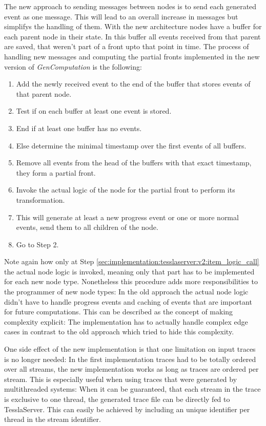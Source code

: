 The new approach to sending messages between nodes is to send each generated event as one message.
This will lead to an overall increase in messages but simplifys the handling of them.
With the new architecture nodes have a buffer for each parent node in their state.
In this buffer all events received from that parent are saved, that weren't part of a front upto that point in time.
The process of handling new messages and computing the partial fronts implemented in the new version of \emph{GenComputation} is the following:

\begin{enumerate}
  \item Add the newly received event to the end of the buffer that stores events of that parent node.
  \item Test if on each buffer at least one event is stored.
  \item End if at least one buffer has no events.
  \item Else determine the minimal timestamp over the first events of all buffers.
  \item Remove all events from the head of the buffers with that exact timestamp, they form a partial front.
  \item\label{sec:implementation:tesslaserver:v2:item_logic_call} Invoke the actual logic of the node for the partial front to perform its transformation.
  \item This will generate at least a new progress event or one or more normal events, send them to all children of the node.
  \item Go to Step 2.
\end{enumerate}

Note again how only at Step \ref{sec:implementation:tesslaserver:v2:item_logic_call} the actual node logic is invoked, meaning only that part has to be implemented for each new node type.
Nonetheless this procedure adds more responsibilities to the programmer of new node types:
In the old approach the actual node logic didn't have to handle progress events and caching of events that are important for future computations.
This can be described as the concept of making complexity explicit: The implementation has to actually handle complex edge cases in contrast to the old approach which tried to hide this complexity.

One side effect of the new implementation is that one limitation on input traces is no longer needed:
In the first implementation traces had to be totally ordered over all streams, the new implementation works as long as traces are ordered per stream.
This is especially useful when using traces that were generated by multithreaded systems: When it can be guaranteed, that each stream in the trace is exclusive to one thread, the generated trace file can be directly fed to TesslaServer.
This can easily be achieved by including an unique identifier per thread in the stream identifier.

